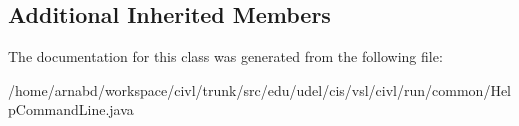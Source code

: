 \subsection*{Additional Inherited Members}


The documentation for this class was generated from the following file\+:\begin{DoxyCompactItemize}
\item 
/home/arnabd/workspace/civl/trunk/src/edu/udel/cis/vsl/civl/run/common/Help\+Command\+Line.\+java\end{DoxyCompactItemize}
